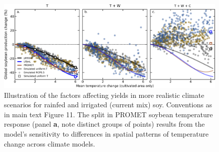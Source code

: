 \documentclass[12pt]{article}
\begin{document}
\begin{figure}[h!]
  \centering
  \includegraphics[width = 16.3cm]{LPJmL_pDSSAT_PROMET_RCP85_all_cases_soy.png}
  \caption{
	  Illustration of the factors affecting yields in more realistic climate scenarios for rainfed and irrigated (current mix) soy. Conventions as in main text Figure 11. The split in PROMET soybean temperature response (panel \textbf{a}, note distinct groups of points) results from the model's sensitivity to differences in spatial patterns of temperature change across climate models. 
  }
\end{figure}

\clearpage
\end{document}
